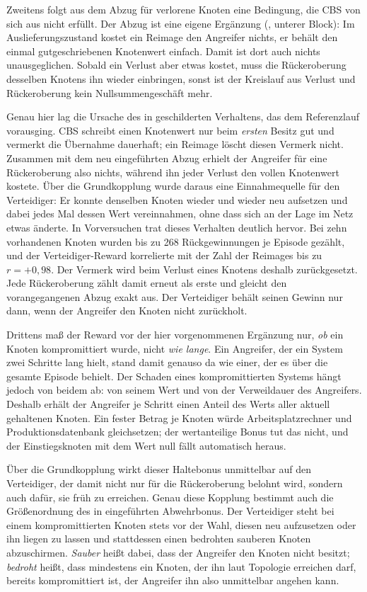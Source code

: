 Zweitens folgt aus dem Abzug für verlorene Knoten eine Bedingung, die \ac{CBS}
von sich aus nicht erfüllt. Der Abzug ist eine eigene Ergänzung
(, unterer Block): Im Auslieferungszustand kostet ein
Reimage den Angreifer nichts, er behält den einmal gutgeschriebenen Knotenwert
einfach. Damit ist dort auch nichts unausgeglichen. Sobald ein Verlust aber
etwas kostet, muss die Rückeroberung desselben Knotens ihn wieder einbringen,
sonst ist der Kreislauf aus Verlust und Rückeroberung kein Nullsummengeschäft
mehr.

Genau hier lag die Ursache des in  geschilderten
Verhaltens, das dem Referenzlauf vorausging. \ac{CBS} schreibt einen Knotenwert
nur beim \emph{ersten} Besitz gut und vermerkt die Übernahme dauerhaft; ein
Reimage löscht diesen Vermerk nicht. Zusammen mit dem neu eingeführten Abzug
erhielt der Angreifer für eine Rückeroberung also nichts, während ihn jeder
Verlust den vollen Knotenwert kostete. Über die Grundkopplung wurde daraus eine
Einnahmequelle für den Verteidiger: Er konnte denselben Knoten wieder und
wieder neu aufsetzen und dabei jedes Mal dessen Wert vereinnahmen, ohne dass
sich an der Lage im Netz etwas änderte. In Vorversuchen trat dieses Verhalten
deutlich hervor. Bei zehn vorhandenen Knoten wurden bis zu 268 Rückgewinnungen
je Episode gezählt, und der Verteidiger-Reward korrelierte mit der Zahl der
Reimages bis zu $r = +0{,}98$. Der Vermerk wird beim Verlust eines Knotens
deshalb zurückgesetzt. Jede Rückeroberung zählt damit erneut als erste und
gleicht den vorangegangenen Abzug exakt aus. Der Verteidiger behält seinen
Gewinn nur dann, wenn der Angreifer den Knoten nicht zurückholt.

Drittens maß der Reward vor der hier vorgenommenen Ergänzung nur, \emph{ob}
ein Knoten kompromittiert wurde, nicht \emph{wie lange}. Ein Angreifer, der ein
System zwei Schritte lang hielt, stand damit genauso da wie einer, der es über
die gesamte Episode behielt. Der Schaden eines kompromittierten Systems hängt
jedoch von beidem ab: von seinem Wert und von der Verweildauer des Angreifers.
Deshalb erhält der Angreifer je Schritt einen Anteil des Werts aller aktuell
gehaltenen Knoten. Ein fester Betrag je Knoten würde
Arbeitsplatz\-rechner und Produktionsdatenbank gleichsetzen; der wertanteilige Bonus tut das
nicht, und der Einstiegsknoten mit dem Wert null fällt automatisch heraus.

Über die Grundkopplung wirkt dieser Haltebonus unmittelbar auf den
Verteidiger, der damit nicht nur für die Rückeroberung belohnt wird, sondern
auch dafür, sie früh zu erreichen. Genau diese Kopplung bestimmt auch die
Größenordnung des in  eingeführten Abwehrbonus. Der
Verteidiger steht bei einem kompromittierten Knoten stets vor der Wahl,
diesen neu aufzusetzen oder ihn liegen zu lassen und stattdessen einen
bedrohten sauberen Knoten abzuschirmen. \emph{Sauber} heißt dabei, dass der
Angreifer den Knoten nicht besitzt; \emph{bedroht} heißt, dass mindestens ein
Knoten, der ihn laut Topologie erreichen darf, bereits kompromittiert ist, der
Angreifer ihn also unmittelbar angehen kann.

